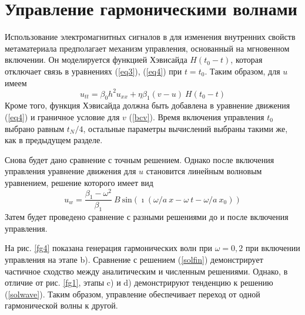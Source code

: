 \section{Управление гармоническими волнами} 

Использование электромагнитных сигналов в \cite {Yang, Chen2014, Xiao2015} для изменения внутренних свойств метаматериала предполагает механизм управления, основанный на мгновенном включении. Он моделируется функцией Хэвисайда $ H (t_0-t) $, которая отключает связь в уравнениях (\ref{eq3}), (\ref{eq4}) при $ t = t_0 $. Таким образом, для $ u $ имеем
\[
u_{tt}=\beta_0 h^2 u_{xx}+\eta \beta_1 (v-u)~H(t_0-t)
\]
Кроме того, функция Хэвисайда должна быть добавлена в уравнение движения (\ref {eq4}) и граничное условие для $ v $ (\ref{bcv}). Время включения управления $ t_0 $ выбрано равным $ t_N / 4 $, остальные параметры вычислений выбраны такими же, как в предыдущем разделе.

Снова будет дано сравнение с точным решением. Однако после включения управления уравнение движения для $ u $ становится линейным волновым уравнением, решение которого имеет вид
\begin{equation}\label{solwave}
u_w=\frac{\beta_1-\omega^2}{\beta_1}~B~{\text{sin}}  (\imath(\omega/a~ x - \omega~ t-\omega/a~ x_0))
\end{equation}
Затем будет проведено сравнение с разными решениями до и после включения управления. 
 
На рис. \ref{fg4} показана генерация гармонических волн при $ \omega = 0,2 $ при включении управления на этапе b). Сравнение с решением (\ref{solfin}) демонстрирует частичное сходство между аналитическим и численным решениями. Однако, в отличие от рис. \ref{fg1}, этапы c) и d) демонстрируют тенденцию к решению (\ref{solwave}). Таким образом, управление обеспечивает переход от одной гармонической волны к другой.

